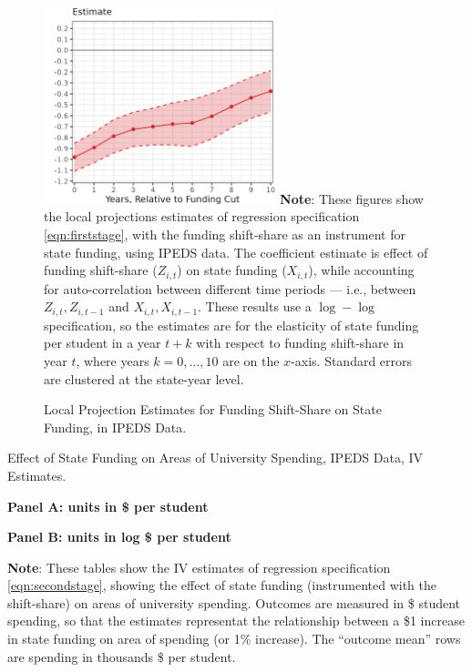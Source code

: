 \begin{figure}[H]
    \centering
    \singlespacing
    \caption{Local Projection Estimates for Funding Shift-Share on State Funding, in IPEDS Data.}
    \includegraphics[width=0.6\textwidth]{figures/firststage-lp.png}
    \label{fig:firststage-lp}
    \justify
    \footnotesize
    \textbf{Note}:
    These figures show the local projections estimates of regression specification \eqref{eqn:firststage}, with the funding shift-share as an instrument for state funding, using IPEDS data.
    The coefficient estimate is effect of funding shift-share ($Z_{i,t}$) on state funding ($X_{i,t}$), while accounting for auto-correlation between different time periods --- i.e., between $Z_{i,t}, Z_{i,t-1}$ and $X_{i,t}, X_{i,t-1}$.
    These results use a $\log-\log$ specification, so the estimates are for the elasticity of state funding per student in a year $t+k$ with respect to funding shift-share in year $t$, where years $k = 0, \hdots, 10$ are on the $x$-axis. 
    Standard errors are clustered at the state-year level.
\end{figure}

\begin{table}[H]
    \singlespacing
    \centering
    \caption{Effect of State Funding on Areas of University Spending, IPEDS Data, IV Estimates.}
    \textbf{Panel A: units in \$ per student}
     
    \makebox[\textwidth][c]{}
    
    \textbf{Panel B: units in log \$ per student}
    
    \makebox[\textwidth][c]{}
    
    \label{tab:expenditures-shock-reg}
    \justify
    \footnotesize
    \textbf{Note}:
    These tables show the IV estimates of regression specification \eqref{eqn:secondstage}, showing the effect of state funding (instrumented with the shift-share) on areas of university spending.
    Outcomes are measured in \$ student spending, so that the estimates representat the relationship between a \$1 increase in state funding on area of spending (or 1\% increase).    
    The ``outcome mean'' rows are spending in thousands \$ per student.
\end{table}

